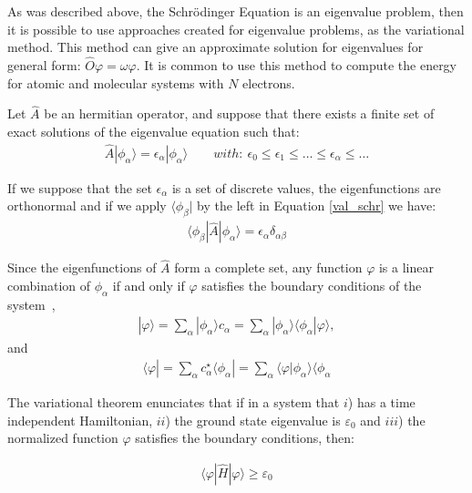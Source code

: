 As was described above, the Schrödinger Equation is an eigenvalue problem, then it
is possible to use approaches created for eigenvalue problems, as the
variational method. This method can give an approximate solution for
eigenvalues for general form: $\widehat{O}\varphi = \omega\varphi$. It is common to use this
method to compute the energy for atomic and molecular systems with $N$
electrons.

Let $\widehat{A}$ be an hermitian operator, and suppose that there exists
a finite set of exact solutions of the eigenvalue equation such that:
%
\begin{align} \widehat{A}|\phi_{\alpha} \rangle =
\epsilon_{\alpha}|\phi_{\alpha} \rangle \qquad with:\ \epsilon_{0} \le
\epsilon_{1} \le \ldots \le \epsilon_{\alpha} \le \ldots \label{val_schr}
\end{align}

\newpage

If we suppose that the set ${\epsilon_{\alpha}}$ is a set of discrete values,
the eigenfunctions are orthonormal and if we apply $\langle\phi_{\beta}|$ by
the left in Equation \ref{val_schr} we have:
%
\begin{align} \langle\phi_{\beta} |\widehat{A} | \phi_{\alpha}\rangle =
\epsilon_{\alpha}\delta_{\alpha\beta} \end{align}

Since the eigenfunctions of $\widehat{A}$ form a complete set, any function
$\varphi$ is a linear combination of $\phi_{\alpha}$ if and only if $\varphi$
satisfies the boundary conditions of the system~\cite{szabo},
%
\begin{align}
|\varphi\rangle = \sum_{\alpha}|\phi_{\alpha}\rangle c_{\alpha} = 
\sum_{\alpha}|\phi_{\alpha}\rangle\langle\phi_{\alpha} |\varphi\rangle,
\end{align}
\noindent and
\begin{align}
\langle\varphi| = \sum_{\alpha}c^{\star}_{\alpha} \langle\phi_{\alpha}|= 
\sum_{\alpha} \langle\varphi | \phi_{\alpha} \rangle \langle\phi_{\alpha}
\end{align}

The variational theorem enunciates that if in a system that $i$) has a time
independent Hamiltonian, $ii$) the ground state eigenvalue is $\varepsilon_0$
and $iii$) the normalized function $\varphi$ satisfies the boundary conditions,
then:

%
\begin{align}
\langle \varphi |\widehat{H}| \varphi \rangle \ge \varepsilon_{0}
\end{align}

